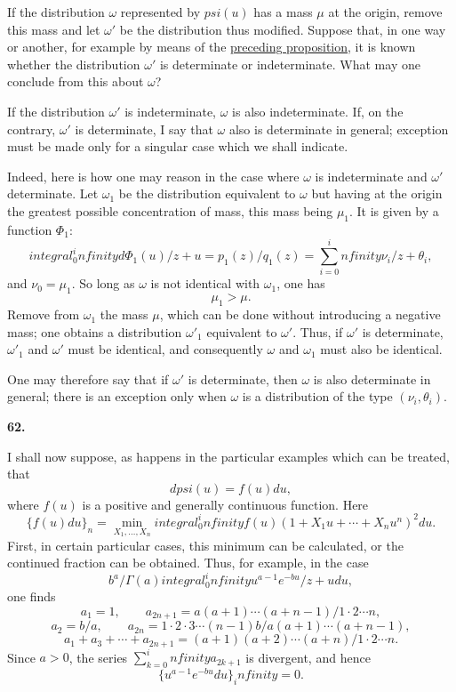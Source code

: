 \documentclass[
  paper=b5,
  fontsize=13pt,
  twoside,
  headings=normal,
  bookmarkpackage=false
]{scrartcl}
\theoremstyle{stieltjesplain}
\theoremstyle{stieltjesdefinition}
\def\int{integral}%
\def\frac#1#2{#1/#2}%
\def\psi{psi}%
\def\infty{infinity}%
\def\,{ }%
\newcommand{\origsection}[1]{%
  \par\addvspace{0.85\baselineskip}%
  \phantomsection\label{sec:#1}%
  \addcontentsline{toc}{subsection}{\texorpdfstring{\S~#1}{Section #1}}%
  \noindent\textbf{#1.}\quad\ignorespaces
}
\begin{document}
If the distribution $\omega$ represented by $\psi(u)$ has a mass $\mu$ at the origin, remove this mass and let $\omega'$ be the distribution thus modified. Suppose that, in one way or another, for example by means of the \hyperref[prop:s61-criterion]{preceding proposition}, it is known whether the distribution $\omega'$ is determinate or indeterminate. What may one conclude from this about $\omega$?

If the distribution $\omega'$ is indeterminate, $\omega$ is also indeterminate. If, on the contrary, $\omega'$ is determinate, I say that $\omega$ also is determinate in general; exception must be made only for a singular case which we shall indicate.

Indeed, here is how one may reason in the case where $\omega$ is indeterminate and $\omega'$ determinate. Let $\omega_1$ be the distribution equivalent to $\omega$ but having at the origin the greatest possible concentration of mass, this mass being $\mu_1$. It is given by a function $\Phi_1$:
\[
  \int_0^\infty\frac{d\Phi_1(u)}{z+u}
  =\frac{p_1(z)}{q_1(z)}
  =\sum_{i=0}^\infty\frac{\nu_i}{z+\theta_i},
\]
and $\nu_0=\mu_1$. So long as $\omega$ is not identical with $\omega_1$, one has
\[
  \mu_1>\mu.
\]
Remove from $\omega_1$ the mass $\mu$, which can be done without introducing a negative mass; one obtains a distribution $\omega'_1$ equivalent to $\omega'$. Thus, if $\omega'$ is determinate, $\omega'_1$ and $\omega'$ must be identical, and consequently $\omega$ and $\omega_1$ must also be identical.

One may therefore say that if $\omega'$ is determinate, then $\omega$ is also determinate in general; there is an exception only when $\omega$ is a distribution of the type $(\nu_i,\theta_i)$.

\origsection{62}
I shall now suppose, as happens in the particular examples which can be treated, that
\[
  d\psi(u)=f(u)\,du,
\]
where $f(u)$ is a positive and generally continuous function. Here
\[
  \{f(u)\,du\}_n
  =\min_{X_1,\ldots,X_n}
  \int_0^\infty f(u)
  (1+X_1u+\cdots+X_nu^n)^2\,du.
\]
First, in certain particular cases, this minimum can be calculated, or
the continued fraction can be obtained. Thus, for example, in the case
\[
  \frac{b^a}{\Gamma(a)}
  \int_0^\infty\frac{u^{a-1}e^{-bu}}{z+u}\,du,
\]
one finds
\[
  a_1=1,\qquad
  a_{2n+1}
  =\frac{a(a+1)\cdots(a+n-1)}{1\cdot2\cdots n},
\]
\[
  a_2=\frac ba,\qquad
  a_{2n}
  =\frac{1\cdot2\cdot3\cdots(n-1)b}
  {a(a+1)\cdots(a+n-1)},
\]
\[
  a_1+a_3+\cdots+a_{2n+1}
  =\frac{(a+1)(a+2)\cdots(a+n)}{1\cdot2\cdots n}.
\]
Since $a>0$, the series $\sum_{k=0}^\infty a_{2k+1}$ is divergent, and hence
\[
  \{u^{a-1}e^{-bu}\,du\}_\infty=0.
\]
\end{document}
